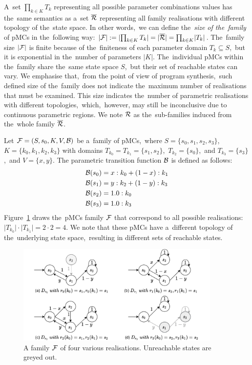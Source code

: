A~set $\prod_{k \in K} T_k$ representing all possible parameter combinations values has the~same semantics as a~set $\overline{\mathcal{R}}$ representing all family realisations with different topology of the~state space.
In other words,~we can define the~\textit{size of the~family} of pMCs in the~following way: $\lvert \mathcal{F} \rvert := \lvert \prod_{k \in K} T_k \rvert = \lvert \overline{\mathcal{R}} \rvert = \prod_{k \in K} \lvert T_k \rvert$.
The~family size $\lvert \mathcal{F} \rvert$ is finite because of the~finiteness of each parameter domain $T_k \subseteq S$,~but it is exponential in the~number of parameters $\lvert K \rvert$.
The~individual pMCs within the~family share the~same state space $S$,~but their set of reachable states can vary.
We emphasise that,~from the point of view of program synthesis,~such defined size of the~family does not indicate the~maximum number of realisations that must be examined.
This size indicates the~number of parametric realisations with different topologies,~which,~however, may still be inconclusive due to continuous parametric regions.
We note $\mathcal{R}$ as the~sub-families induced from the~whole family $\overline{\mathcal{R}}$.

\begin{example}\label{exam:mcfamily}
Let $\mathcal{F} = (S,s_{0},K, V, \mathcal{B})$ be a~family of pMCs,~where $S = \{s_0, s_1, s_2, s_3\}$,~$K = \{ k_0, k_1, k_2, k_3 \}$ with domains $T_{k_0} = T_{k_1} = \{s_1, s_2\}$,~$T_{k_2} = \{ s_0 \}$,~and $T_{k_3} = \{ s_3 \}$,~and $V = \{ x, y \}$.
The parametric transition function $\mathcal{B}$ is defined as follows:
\begin{align*}
    \mathcal{B}(s_0) &= x : k_0 + (1-x) : k_1  \\
    \mathcal{B}(s_1)  &= y : k_2  + (1-y) : k_3 \\
    \mathcal{B}(s_2) &= 1.0 : k_0  \\
    \mathcal{B}(s_3)  &= 1.0 : k_3
\end{align*}
Figure~\ref{fig:mcfamily} draws the~pMCs family $\mathcal{F}$ that correspond to all possible realisations: $\lvert T_{k_0} \rvert \cdot \lvert T_{k_1} \rvert = 2 \cdot 2 = 4$.
We note that these pMCs have a~different topology of the~underlying state space,~resulting in different sets of reachable states.
\end{example}

\begin{figure}[ht!]
\centering
\includegraphics[width=0.9\textwidth]{figures/MCFamily.pdf}
\caption{A family $\mathcal{F}$ of four various realisations. Unreachable states are greyed out.}%
\label{fig:mcfamily}%
\end{figure}

